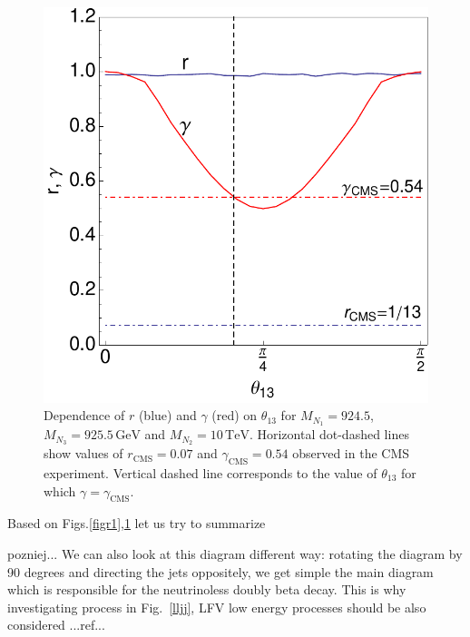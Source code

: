 \documentclass[twocolumn,superscriptaddress,showpacs,prl,nofootinbib,floatfix]{revtex4}
\begin{document}
\begin{figure}[h!]
\begin{center}
\includegraphics[scale=0.6]{splitting1GeV-3}
\caption{Dependence of $r$ (blue) and $\gamma$ (red) on $\theta_{13}$ for $M_{N_1}=924.5$, $M_{N_3}=925.5\,\mathrm{GeV}$ and $M_{N_2}=10\,\mathrm{TeV}$. Horizontal dot-dashed lines show values of $r_{\mathrm{CMS}}=0.07$ and $\gamma_{\mathrm{CMS}}=0.54$ observed in the CMS experiment. Vertical dashed line corresponds to the value of $\theta_{13}$ for which $\gamma=\gamma_{\mathrm{CMS}}$.}\label{figr2}
\end{center}
\end{figure}


Based on Figs.\ref{figr1},\ref{figr2} let us try to summarize  


pozniej...
We can also  look at this diagram different way: rotating the diagram by 90 degrees and directing the jets oppositely, we get simple the main diagram which is responsible for the neutrinoless doubly beta decay. This is why investigating  process in Fig.~\ref{lljj}, LFV low energy processes should be also considered ...ref...

 
\end{document}
